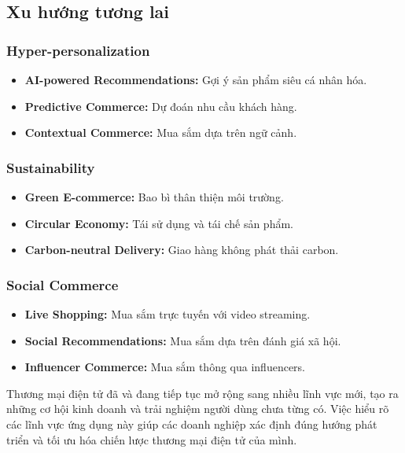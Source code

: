 \documentclass[a4paper,12pt]{report}
\begin{document}
\subsection{Xu hướng tương lai}

\subsubsection{Hyper-personalization}
\begin{itemize}
    \item \textbf{AI-powered Recommendations:} Gợi ý sản phẩm siêu cá nhân hóa.
    \item \textbf{Predictive Commerce:} Dự đoán nhu cầu khách hàng.
    \item \textbf{Contextual Commerce:} Mua sắm dựa trên ngữ cảnh.
\end{itemize}

\subsubsection{Sustainability}
\begin{itemize}
    \item \textbf{Green E-commerce:} Bao bì thân thiện môi trường.
    \item \textbf{Circular Economy:} Tái sử dụng và tái chế sản phẩm.
    \item \textbf{Carbon-neutral Delivery:} Giao hàng không phát thải carbon.
\end{itemize}

\subsubsection{Social Commerce}
\begin{itemize}
    \item \textbf{Live Shopping:} Mua sắm trực tuyến với video streaming.
    \item \textbf{Social Recommendations:} Mua sắm dựa trên đánh giá xã hội.
    \item \textbf{Influencer Commerce:} Mua sắm thông qua influencers.
\end{itemize}

Thương mại điện tử đã và đang tiếp tục mở rộng sang nhiều lĩnh vực mới, tạo ra những cơ hội kinh doanh và trải nghiệm người dùng chưa từng có. Việc hiểu rõ các lĩnh vực ứng dụng này giúp các doanh nghiệp xác định đúng hướng phát triển và tối ưu hóa chiến lược thương mại điện tử của mình.
\end{document}
